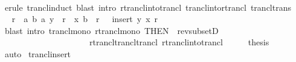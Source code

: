 \begin{isabellebody}
\ \ \ \ \isamarkupfalse%
\ {\isacharparenleft}{\kern0pt}erule\ trancl{\isacharunderscore}{\kern0pt}induct{\isacharparenright}{\kern0pt}\ {\isacharparenleft}{\kern0pt}blast\ intro{\isacharcolon}{\kern0pt}\ rtrancl{\isacharunderscore}{\kern0pt}into{\isacharunderscore}{\kern0pt}trancl{}\ trancl{\isacharunderscore}{\kern0pt}into{\isacharunderscore}{\kern0pt}rtrancl\ trancl{\isacharunderscore}{\kern0pt}trans{\isacharparenright}{\kern0pt}{\isacharplus}{\kern0pt}\isanewline
\ \ \isamarkupfalse%
\ \isamarkupfalse%
\ {\isachardoublequoteopen}r\isactrlsup {\isacharplus}{\kern0pt}\ {\isasymunion}\ {\isacharbraceleft}{\kern0pt}{\isacharparenleft}{\kern0pt}a{\isacharcomma}{\kern0pt}\ b{\isacharparenright}{\kern0pt}{\isachardot}{\kern0pt}\ {\isacharparenleft}{\kern0pt}a{\isacharcomma}{\kern0pt}\ y{\isacharparenright}{\kern0pt}\ {\isasymin}\ r\isactrlsup {\isacharasterisk}{\kern0pt}\ {\isasymand}\ {\isacharparenleft}{\kern0pt}x{\isacharcomma}{\kern0pt}\ b{\isacharparenright}{\kern0pt}\ {\isasymin}\ r\isactrlsup {\isacharasterisk}{\kern0pt}{\isacharbraceright}{\kern0pt}\ \ {\isasymsubseteq}\ {\isacharparenleft}{\kern0pt}insert\ {\isacharparenleft}{\kern0pt}y{\isacharcomma}{\kern0pt}\ x{\isacharparenright}{\kern0pt}\ r{\isacharparenright}{\kern0pt}\isactrlsup {\isacharplus}{\kern0pt}{\isachardoublequoteclose}\isanewline
\ \ \ \ \isamarkupfalse%
\ {\isacharparenleft}{\kern0pt}blast\ intro{\isacharcolon}{\kern0pt}\ trancl{\isacharunderscore}{\kern0pt}mono\ rtrancl{\isacharunderscore}{\kern0pt}mono\ {\isacharbrackleft}{\kern0pt}THEN\ {\isacharbrackleft}{\kern0pt}{}{\isacharbrackright}{\kern0pt}\ rev{\isacharunderscore}{\kern0pt}subsetD{\isacharbrackright}{\kern0pt}\isanewline
\ \ \ \ \ \ \ \ \ \ \ \ \ \ \ \ \ \ \ \ \ rtrancl{\isacharunderscore}{\kern0pt}trancl{\isacharunderscore}{\kern0pt}trancl\ rtrancl{\isacharunderscore}{\kern0pt}into{\isacharunderscore}{\kern0pt}trancl{}{\isacharparenright}{\kern0pt}\isanewline
\ \ \isamarkupfalse%
\ \isamarkupfalse%
\ {\isacharquery}{\kern0pt}thesis\isanewline
\ \ \ \ \isamarkupfalse%
\ auto\isanewline
{}\isamarkupfalse%
%
\endisatagproof
{\isafoldproof}%
%
\isadelimproof
\isanewline
%
\endisadelimproof
\isanewline
{}\isamarkupfalse%
\ trancl{\isacharunderscore}{\kern0pt}insert{}{\isacharcolon}{\kern0pt}\isanewline

\end{isabellebody}
